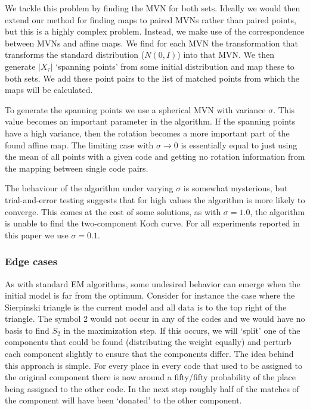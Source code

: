 \documentclass[10pt,a4paper,oneside]{article}
\theoremstyle{definition}
\begin{document}
We tackle this problem by finding the MVN for both sets. Ideally we would then extend our method for finding maps to paired MVNs rather than paired points, but this is a highly complex problem. Instead, we make use of the correspondence between MVNs and affine maps. We find for each MVN the transformation that transforms the standard distribution ($N(0, I)$) into that MVN. We then generate $|X_\tau|$ `spanning points' from some initial distribution and map these to both sets. We add these point pairs to the list of matched points from which the maps will be calculated.

To generate the spanning points we use a spherical MVN with variance $\sigma$. This value becomes an important parameter in the algorithm. If the spanning points have a high variance, then the rotation becomes a more important part of the found affine map. The limiting case with $\sigma \rightarrow 0$ is essentially equal to just using the mean of all points with a given code and getting no rotation information from the mapping between single code pairs.

The behaviour of the algorithm under varying $\sigma$ is somewhat mysterious, but trial-and-error testing suggests that for high values the algorithm is more likely to converge. This comes at the cost of some solutions, as with $\sigma = 1.0$, the algorithm is unable to find the two-component Koch curve. For all experiments reported in this paper we use $\sigma = 0.1$. 

\subsubsection*{Edge cases}

As with standard EM algorithms, some undesired behavior can emerge when the initial model is far from the optimum. Consider for instance the case where the Sierpinski triangle is the current model and all data is to the top right of the triangle. The symbol 2 would not occur in any of the codes and we would have no basis to find $S_2$ in the maximization step. If this occurs, we will `split' one of the components that could be found  (distributing the weight equally) and perturb each component slightly to ensure that the components differ. The idea behind this approach is simple. For every place in every code that used to be assigned to the original component there is now around a fifty/fifty probability of the place being assigned to the other code. In the next step roughly half of the matches of the component will have been `donated' to the other component.
\end{document}

